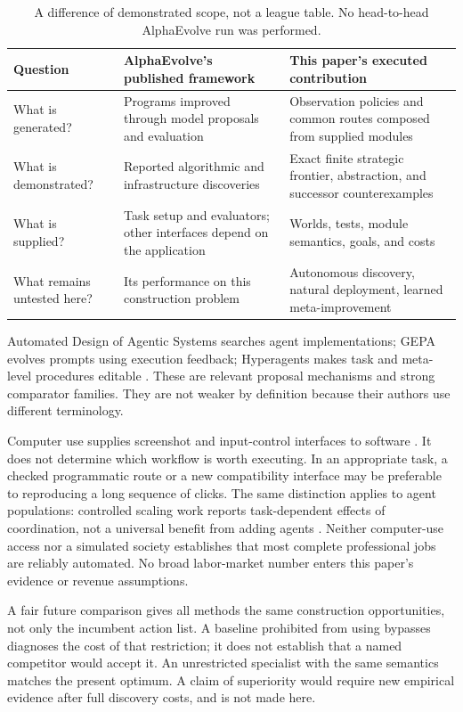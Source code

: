 \documentclass[11pt,letterpaper]{article}
\theoremstyle{remark}\newtheorem{remark}{Remark}[section]
\begin{document}
\begin{table}[htbp]\centering\small
\caption{A difference of demonstrated scope, not a league table. No head-to-head AlphaEvolve run was performed.}\label{tab:compare}
\begin{tabularx}{\linewidth}{@{}P{.23\linewidth}YY@{}}\toprule
Question & AlphaEvolve's published framework & This paper's executed contribution\\\midrule
What is generated? & Programs improved through model proposals and evaluation & Observation policies and common routes composed from supplied modules\\
What is demonstrated? & Reported algorithmic and infrastructure discoveries & Exact finite strategic frontier, abstraction, and successor counterexamples\\
What is supplied? & Task setup and evaluators; other interfaces depend on the application & Worlds, tests, module semantics, goals, and costs\\
What remains untested here? & Its performance on this construction problem & Autonomous discovery, natural deployment, learned meta-improvement\\\bottomrule
\end{tabularx}
\end{table}

Automated Design of Agentic Systems searches agent implementations; GEPA evolves prompts using execution feedback; Hyperagents makes task and meta-level procedures editable \citep{adas,gepa,hyperagents}. These are relevant proposal mechanisms and strong comparator families. They are not weaker by definition because their authors use different terminology.

Computer use supplies screenshot and input-control interfaces to software \citep{computeruse}. It does not determine which workflow is worth executing. In an appropriate task, a checked programmatic route or a new compatibility interface may be preferable to reproducing a long sequence of clicks. The same distinction applies to agent populations: controlled scaling work reports task-dependent effects of coordination, not a universal benefit from adding agents \citep{agentscaling}. Neither computer-use access nor a simulated society establishes that most complete professional jobs are reliably automated. No broad labor-market number enters this paper's evidence or revenue assumptions.

A fair future comparison gives all methods the same construction opportunities, not only the incumbent action list. A baseline prohibited from using bypasses diagnoses the cost of that restriction; it does not establish that a named competitor would accept it. An unrestricted specialist with the same semantics matches the present optimum. A claim of superiority would require new empirical evidence after full discovery costs, and is not made here.
\end{document}
